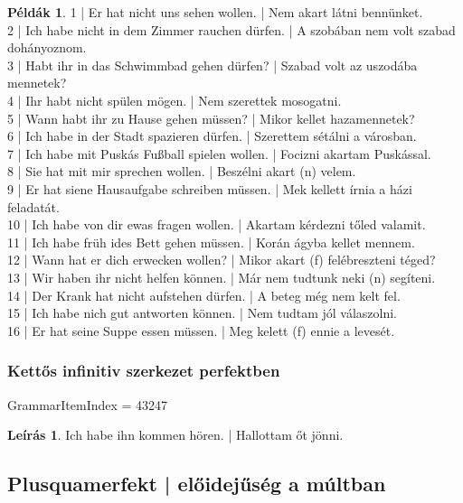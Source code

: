 \documentclass{article}
\theoremstyle{definition}
\newtheorem*{exmp}{Példák}
\newtheorem*{desc}{Leírás}
\begin{document}
\begin{exmp}
1 | Er hat nicht uns sehen wollen. | Nem akart látni bennünket.\\
2 | Ich habe nicht in dem Zimmer rauchen dürfen. | A szobában nem volt szabad dohányoznom.\\
3 | Habt ihr in das Schwimmbad gehen dürfen? | Szabad volt az uszodába mennetek?\\
4 | Ihr habt nicht spülen mögen. | Nem szerettek mosogatni.\\
5 | Wann habt ihr zu Hause gehen müssen? | Mikor kellet hazamennetek?\\
6 | Ich habe in der Stadt spazieren dürfen. | Szerettem sétálni a városban.\\
7 | Ich habe mit Puskás Fußball spielen wollen. | Focizni akartam Puskással.\\
8 | Sie hat mit mir sprechen wollen. | Beszélni akart (n) velem.\\
9 | Er hat siene Hausaufgabe schreiben müssen. | Mek kellett írnia a házi feladatát.\\
10 | Ich habe von dir ewas fragen wollen. | Akartam kérdezni tőled valamit.\\
11 | Ich habe früh ides Bett gehen müssen. | Korán ágyba kellet mennem.\\
12 | Wann hat er dich erwecken wollen? | Mikor akart (f) felébreszteni téged?\\
13 | Wir haben ihr nicht helfen können. | Már nem tudtunk neki (n) segíteni.\\
14 | Der Krank hat nicht aufstehen dürfen. | A beteg még nem kelt fel.\\
15 | Ich habe nich gut antworten können. | Nem tudtam jól válaszolni.\\
16 | Er hat seine Suppe essen müssen. | Meg kelett (f) ennie a levesét.\\
\end{exmp}

\subsubsection{Kettős infinitiv szerkezet perfektben}

GrammarItemIndex = 43247

\begin{desc}
Ich habe ihn kommen hören. | Hallottam őt jönni.
\end{desc}

\subsection{Plusquamerfekt | előidejűség a múltban}
\end{document}
